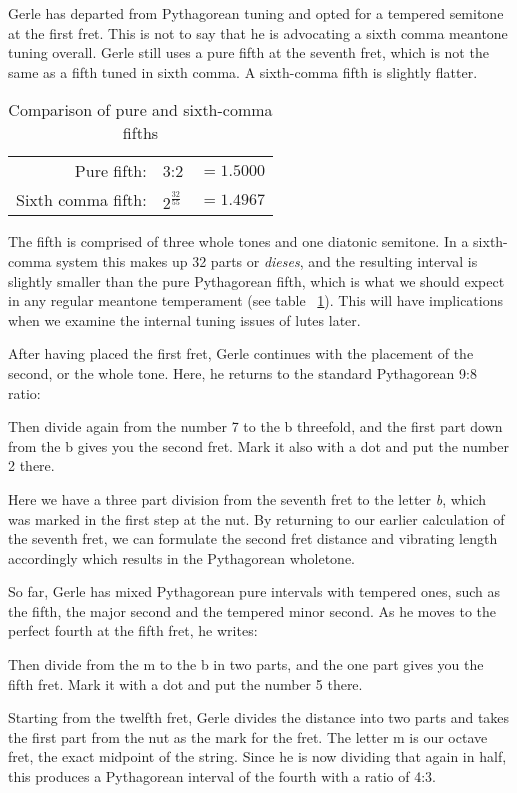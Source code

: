 Gerle has departed from Pythagorean tuning and opted for a tempered semitone at the first
fret.  This is not to say that he is advocating a sixth comma meantone tuning overall.
Gerle still uses a pure fifth at the seventh fret, which is not the same as a
fifth tuned in sixth comma.  A sixth-comma fifth is slightly flatter.
\begin{table}[h!]
    \begin{center}
    \begin{tabular}{ r l l }
        Pure fifth:        & 3:2                 & $ = 1.5000 $ \\
        Sixth comma fifth: & $ 2^\frac{32}{55} $ & $ = 1.4967 $ \\
    \end{tabular}
    \end{center}
    \caption{Comparison of pure and sixth-comma fifths}
    \label{table:6fifths}
\end{table}
The fifth is comprised of three whole tones and one diatonic semitone. In a sixth-comma
system this makes up 32 parts or \textit{dieses}, and the resulting interval is slightly smaller
than the pure Pythagorean fifth, which is what we should expect in any regular meantone
temperament (see table ~\ref{table:6fifths}). This will have implications when we examine
the internal tuning issues of lutes later.

After having placed the first fret, Gerle continues with the placement of the second, or the whole tone.
Here, he returns to the standard Pythagorean 9:8 ratio:
\begin{blocks}
Then divide again from the number 7 to the b threefold, and the first part down
from the b gives you the second fret.  Mark it also with a dot and put the
number 2 there.
\end{blocks}
Here we have a three part division from the seventh fret to the letter \textit{b}, 
which was marked in the first step at the nut.
By returning to our earlier calculation of the seventh fret, we can formulate the
second fret distance and vibrating length accordingly which results in the Pythagorean
wholetone.

So far, Gerle has mixed Pythagorean pure intervals with tempered ones, such as
the fifth, the major second and the tempered minor second.  As he moves to the
perfect fourth at the fifth fret, he writes:
\begin{blocks}
Then divide from the m to the b in two parts, and the one part gives you the
fifth fret. Mark it with a dot and put the number 5 there.
\end{blocks}
Starting from the twelfth fret, Gerle divides the distance into two parts and takes the
first part from the nut as the mark for the fret. The letter m is our octave fret, the
exact midpoint of the string. Since he is now dividing that again in half, this
produces a Pythagorean interval of the fourth with a ratio of 4:3.

